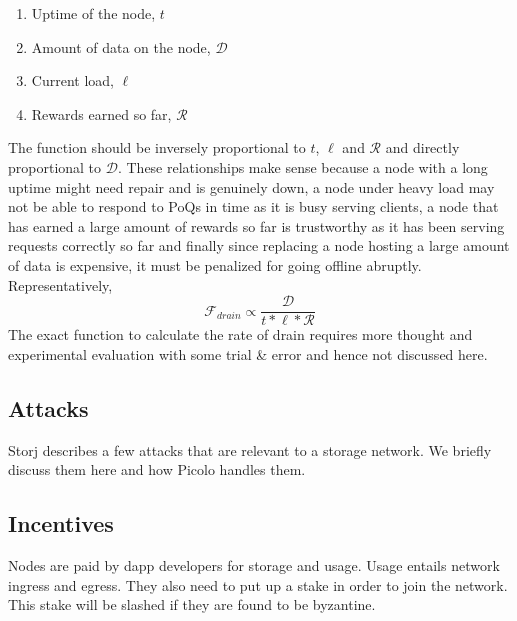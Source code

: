  \begin{enumerate}
	\item Uptime of the node, $t$
	\item Amount of data on the node, $\mathcal{D}$
	\item Current load, $\ell$
	\item Rewards earned so far, $\mathcal{R}$
\end{enumerate}
The function should be inversely proportional to $t$, $\ell$ and $\mathcal{R}$ and directly proportional to $\mathcal{D}$. These relationships make sense because a node with a long uptime might need repair and is genuinely down, a node under heavy load may not be able to respond to PoQs in time as it is busy serving clients, a node that has earned a large amount of rewards so far is trustworthy as it has been serving requests correctly so far and finally since replacing a node hosting a  large amount of data is expensive, it must be penalized for going offline abruptly. Representatively,
\newline
$$ \mathcal{F}_{drain} \propto \frac{\mathcal{D}} {t * \ell * \mathcal{R}}$$
\newline
The exact function to calculate the rate of drain requires more thought and experimental evaluation with some trial \& error and hence not discussed here.
\subsection{Attacks}
Storj \cite{Storj} describes a few attacks that are relevant to a storage network. We briefly discuss them here and how Picolo handles them.
\subsection{Incentives}
Nodes are paid by dapp developers for storage and usage. Usage entails network ingress and egress. They also need to put up a stake in order to join the network. This stake will be slashed if they are found to be byzantine.